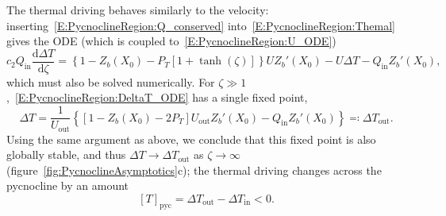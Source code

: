 \documentclass{jfm}
\newcommand{\dd}[2]{\frac{\mathrm{d} #1}{\mathrm{d} #2}}
\newcommand{\Pt}{\textit{P}_T}
\newcommand{\ctwo}{c_2}  %
\renewcommand{\in}{\text{in}} %
\newcommand{\out}{\text{out}}
\begin{document}
The thermal driving behaves similarly to the velocity: inserting~\eqref{E:PycnoclineRegion:Q_conserved} into~\eqref{E:PycnoclineRegion:Themal} gives the ODE (which is coupled to~\eqref{E:PycnoclineRegion:U_ODE})
\begin{equation}\label{E:PycnoclineRegion:DeltaT_ODE}
\ctwo Q_\in \dd{\Delta T}{\zeta} = \left\{1 - Z_b(X_0) - \Pt\left[1 + \tanh(\zeta)\right]\right\}UZ_b'(X_0) - U\Delta T - Q_\in Z_b'(X_0), 
\end{equation}
which must also be solved numerically. For $\zeta \gg 1$,~\eqref{E:PycnoclineRegion:DeltaT_ODE} has a single fixed point,
\begin{equation}\label{E:PycnoclineRegion:DeltaT_Limit}
\Delta T = \frac{1}{U_\out}\left\{\left[1 - Z_b(X_0) - 2\Pt\right]U_\out Z_b'(X_0) - Q_\in Z_b'(X_0)\right\} \eqcolon \Delta T_\out.
\end{equation}
Using the same argument as above, we conclude that this fixed point is also globally stable, and thus $\Delta T \to \Delta T_\out$ as $\zeta \to \infty$ (figure~\ref{fig:PycnoclineAsymptotics}c); the thermal driving changes across the pycnocline by an amount 
\begin{equation}\label{E:PycnoclineRegion:DeltaT_change}
\left[T\right]_{\text{pyc}} = \Delta T_\out - \Delta T_\in < 0.
\end{equation} 
\end{document}
